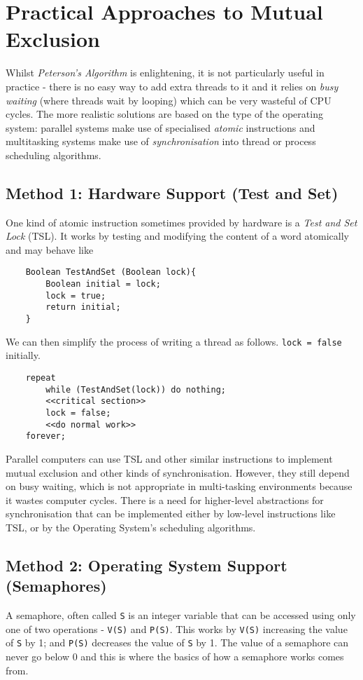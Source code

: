 \section{Practical Approaches to Mutual Exclusion}
Whilst \textit{Peterson's Algorithm} is enlightening, it is not particularly useful in practice - there is no easy way to add extra threads to it and it relies on \textit{busy waiting} (where threads wait by looping) which can be very wasteful of CPU cycles. The more realistic solutions are based on the type of the operating system: parallel systems make use of specialised \textit{atomic} instructions and multitasking systems make use of \textit{synchronisation} into thread or process scheduling algorithms.

\subsection{Method 1: Hardware Support (Test and Set)}
One kind of atomic instruction sometimes provided by hardware is a \textit{Test and Set Lock} (TSL). It works by testing and modifying the content of a word atomically and may behave like
\begin{verbatim}
    Boolean TestAndSet (Boolean lock){
        Boolean initial = lock;
        lock = true;
        return initial;
    }
\end{verbatim}
We can then simplify the process of writing a thread as follows. \verb|lock = false| initially.
\begin{verbatim}
    repeat
        while (TestAndSet(lock)) do nothing;
        <<critical section>>
        lock = false;
        <<do normal work>>
    forever;
\end{verbatim}
Parallel computers can use TSL and other similar instructions to implement mutual exclusion and other kinds of synchronisation. However, they still depend on busy waiting, which is not appropriate in multi-tasking environments because it wastes computer cycles. There is a need for higher-level abstractions for synchronisation that can be implemented either by low-level instructions like TSL, or by the Operating System's scheduling algorithms.

\subsection{Method 2: Operating System Support (Semaphores)}
A semaphore, often called \verb|S| is an integer variable that can be accessed using only one of two operations - \verb|V(S)| and \verb|P(S)|. This works by \verb|V(S)| increasing the value of \verb|S| by 1; and \verb|P(S)| decreases the value of \verb|S| by 1. The value of a semaphore can never go below 0 and this is where the basics of how a semaphore works comes from.\\

